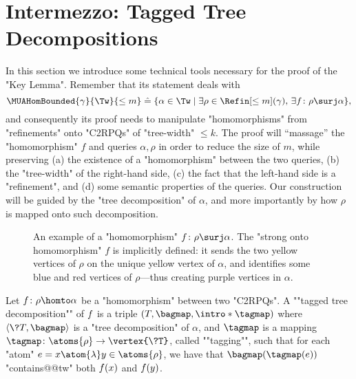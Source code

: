 \section{\AP{}Intermezzo: Tagged Tree Decompositions}
\label{sec:treedec}

In this section we introduce some technical tools necessary for the proof of
the "Key Lemma". Remember that its statement deals with
\[
	\MUAHomBounded{\gamma}{\Tw}{\leq m} \defeq 
    \{ 
        \alpha \in \Tw
        \mid
        \exists \rho \in \Refin[\leq m](\gamma),\, \exists \fun\colon \rho \surj \alpha
    \},
\]
and consequently its proof needs to manipulate "homomorphisms"
from "refinements" onto "C2RPQs" of "tree-width" $\leq k$.
The proof will ``massage'' the "homomorphism" $f$ and queries $\alpha,\rho$ in order to reduce the size of $m$, while preserving (a) the existence of a "homomorphism" between the two queries,
(b) the "tree-width" of the right-hand side, (c) the fact that the left-hand side is a "refinement",
and (d) some semantic properties of the queries. Our construction will be guided by
the "tree decomposition" of $\alpha$, and more importantly by how $\rho$ is mapped onto such decomposition.

\begin{figure}[tbp]
	\centering
	\hfill
	\hfill
	\caption{
		\AP\label{fig:trio}
		An example of a "homomorphism" $f\colon \rho \surj \alpha$.
		The "strong onto homomorphism" $f$ is implicitly defined: it sends the two yellow
		vertices of $\rho$ on the unique yellow vertex of $\alpha$, and identifies some
		blue and red vertices of $\rho$---thus creating purple vertices in $\alpha$.
	}
\end{figure}

\begin{definition}
    \AP Let $\fun\colon \rho \homto \alpha$ be a "homomorphism" between two "C2RPQs".
    A ""tagged tree decomposition""
    of $f$ is a triple $(T, \bagmap, \intro*\tagmap)$ where
    $\tup{\?T, \bagmap}$ is a "tree decomposition" of $\alpha$,
    and $\tagmap$ is a mapping $\tagmap\colon \atoms{\rho} \to \vertex{\?T}$, called \AP""tagging"",
    such that for each "atom" $e = x \atom{\lambda} y \in \atoms{\rho}$, we have that $\bagmap(\tagmap(e))$ "contains@@tw" both $f(x)$ and
    $f(y)$.
\end{definition}

